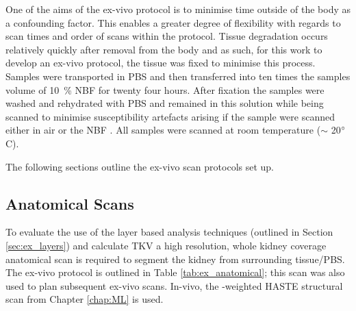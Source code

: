 One of the aims of the ex-vivo protocol is to minimise time outside of the body as a confounding factor. This enables a greater degree of flexibility with regards to scan times and order of scans within the protocol. Tissue degradation occurs relatively quickly after removal from the body and as such, for this work to develop an ex-vivo protocol, the tissue was fixed to minimise this process. Samples were transported in \acf{PBS} and then transferred into ten times the samples volume of 10~\% \acf{NBF} for twenty four hours. After fixation the samples were washed and rehydrated with \ac{PBS} and remained in this solution while being scanned to minimise susceptibility artefacts arising if the sample were scanned either in air or the \ac{NBF} \cite{sengupta_high_2017}. All samples were scanned at room temperature ($\sim$ 20$\degree$C).


The following sections outline the ex-vivo scan protocols set up.
\subsection{Anatomical Scans}
\label{subsec:ex_anatomical_scans}
To evaluate the use of the layer based analysis techniques (outlined in Section \ref{sec:ex_layers}) and calculate \ac{TKV} a high resolution, whole kidney coverage anatomical scan is required to segment the kidney from surrounding tissue/\ac{PBS}. The ex-vivo protocol is outlined in Table \ref{tab:ex_anatomical}; this scan was also used to plan subsequent ex-vivo scans. In-vivo, the \ttwo-weighted \ac{HASTE} structural scan from Chapter \ref{chap:ML} is used.

